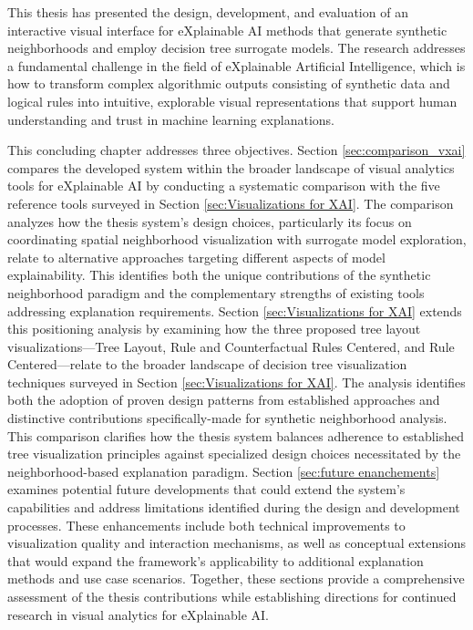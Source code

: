 

This thesis has presented the design, development, and evaluation of an interactive visual interface for eXplainable AI methods that generate synthetic neighborhoods and employ decision tree surrogate models. The research addresses a fundamental challenge in the field of eXplainable Artificial Intelligence, which is how to transform complex algorithmic outputs consisting of synthetic data and logical rules into intuitive, explorable visual representations that support human understanding and trust in machine learning explanations.

This concluding chapter addresses three objectives. Section \ref{sec:comparison_vxai} compares the developed system within the broader landscape of visual analytics tools for eXplainable AI by conducting a systematic comparison with the five reference tools surveyed in Section \ref{sec:Visualizations for XAI}. The comparison analyzes how the thesis system's design choices, particularly its focus on coordinating spatial neighborhood visualization with surrogate model exploration, relate to alternative approaches targeting different aspects of model explainability. This identifies both the unique contributions of the synthetic neighborhood paradigm and the complementary strengths of existing tools addressing explanation requirements.
Section \ref{sec:Visualizations for XAI} extends this positioning analysis by examining how the three proposed tree layout visualizations—Tree Layout, Rule and Counterfactual Rules Centered, and Rule Centered—relate to the broader landscape of decision tree visualization techniques surveyed in Section \ref{sec:Visualizations for XAI}. The analysis identifies both the adoption of proven design patterns from established approaches and distinctive contributions specifically-made for synthetic neighborhood analysis. This comparison clarifies how the thesis system balances adherence to established tree visualization principles against specialized design choices necessitated by the neighborhood-based explanation paradigm.
Section \ref{sec:future enanchements} examines potential future developments that could extend the system's capabilities and address limitations identified during the design and development processes. These enhancements include both technical improvements to visualization quality and interaction mechanisms, as well as conceptual extensions that would expand the framework's applicability to additional explanation methods and use case scenarios. Together, these sections provide a comprehensive assessment of the thesis contributions while establishing directions for continued research in visual analytics for eXplainable AI.